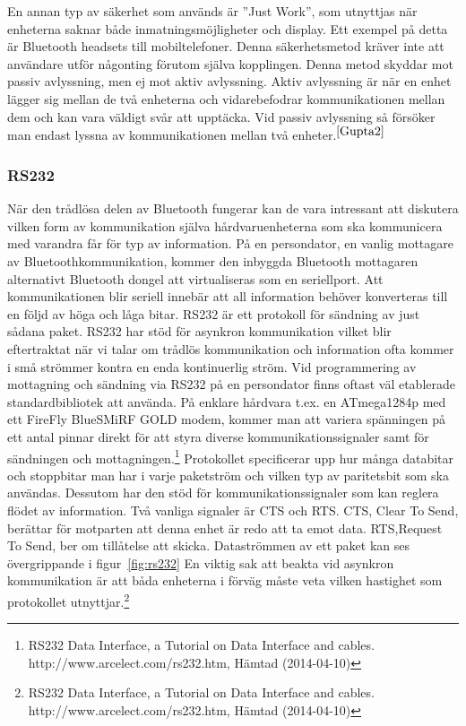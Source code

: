 \documentclass[a4paper,12pt,fleqn]{article}
\begin{document}
En annan typ av säkerhet som används är ''Just Work'', som utnyttjas när enheterna saknar både inmatningsmöjligheter och display. Ett exempel på detta är Bluetooth headsets till mobiltelefoner. Denna säkerhetsmetod kräver inte att användare utför någonting förutom själva kopplingen. Denna metod skyddar mot passiv avlyssning, men ej mot aktiv avlyssning. 
Aktiv avlyssning är när en enhet lägger sig mellan de två enheterna och vidarebefodrar kommunikationen mellan dem och kan vara väldigt svår att upptäcka.
Vid passiv avlyssning så försöker man endast lyssna av kommunikationen mellan två enheter.$^{\ref{Gupta2}}$

\subsubsection{RS232}
När den trådlösa delen av Bluetooth fungerar kan de vara intressant att diskutera vilken form av kommunikation själva hårdvaruenheterna som ska kommunicera med varandra får för typ av information. På en persondator, en vanlig mottagare av Bluetoothkommunikation, kommer den inbyggda Bluetooth mottagaren alternativt Bluetooth dongel att virtualiseras som en seriellport. Att kommunikationen blir seriell innebär att all information behöver konverteras till en följd av höga och låga bitar. RS232 är ett protokoll för sändning av just sådana paket. RS232 har stöd för asynkron kommunikation vilket blir eftertraktat när vi talar om trådlös kommunikation och information ofta kommer i små strömmer kontra en enda kontinuerlig ström. Vid programmering av mottagning och sändning via RS232 på en persondator finns oftast väl etablerade standardbibliotek att använda.
På enklare hårdvara t.ex. en ATmega1284p med ett FireFly BlueSMiRF GOLD modem, kommer man att variera spänningen på ett antal pinnar direkt för att styra diverse kommunikationssignaler samt för sändningen och mottagningen.\footnote{RS232 Data Interface, a Tutorial on Data Interface and cables. http://www.arcelect.com/rs232.htm, Hämtad (2014-04-10)}
\newpage
Protokollet specificerar upp hur många databitar och stoppbitar man har i varje paketström och vilken typ av paritetsbit som ska användas. Dessutom har den stöd för kommunikationssignaler som kan reglera flödet av information. Två vanliga signaler är CTS och RTS. CTS, Clear To Send, berättar för motparten att denna enhet är redo att ta emot data. RTS,Request To Send, ber om tillåtelse att skicka. Dataströmmen av ett paket kan ses övergrippande i figur~\ref{fig:rs232}
En viktig sak att beakta vid asynkron kommunikation är att båda enheterna i förväg måste veta vilken hastighet som protokollet utnyttjar.\footnote{RS232 Data Interface, a Tutorial on Data Interface and cables. http://www.arcelect.com/rs232.htm, Hämtad (2014-04-10)}
\end{document}
